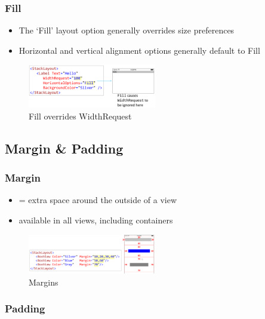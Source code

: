 \documentclass{article}
\begin{document}
\subsubsection{Fill}


\begin{itemize}
    \item The `Fill' layout option generally overrides size preferences
    \item Horizontal and vertical alignment options generally default to Fill
\end{itemize}

\begin{figure}[H]
    \centering
    \includegraphics[width=0.5\textwidth]{xaml-fill.png}
    \caption{Fill overrides WidthRequest}
\end{figure}

\subsection{Margin \& Padding}

\subsubsection{Margin}

\begin{itemize}
    \item = extra space around the outside of a view
    \item available in all views, including containers
\end{itemize}

\begin{figure}[H]
    \centering
    \includegraphics[width=0.5\textwidth]{xaml-margins.png}
    \caption{Margins}
\end{figure}

\subsubsection{Padding}
\end{document}
